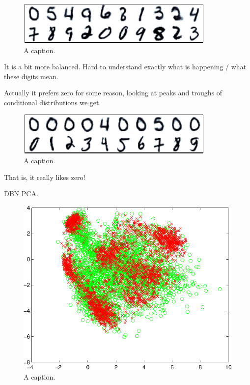 \documentclass{article} %
\begin{document}
\begin{figure}[ht]
\centering
\includegraphics[width=0.98\columnwidth]{figures/many_rbm_witness_peaks}
\caption{
A caption.
}
\label{fig:many_rbm_witness_peaks}
\end{figure}

It is a bit more balanced.
Hard to understand exactly what is happening / what these digits mean.

Actually it prefers zero for some reason, looking at peaks and troughs of conditional distributions we get.

\begin{figure}[ht]
\centering
\includegraphics[width=0.98\columnwidth]{figures/many_rbm_cond}
\caption{
A caption.
}
\label{fig:many_rbm_cond}
\end{figure}

That is, it really likes zero!

DBN PCA.

\begin{figure}[ht]
\centering
\includegraphics[width=0.98\columnwidth]{figures/dbn_pca}
\caption{
A caption.
}
\label{fig:dbn_pca}
\end{figure}
\end{document}
